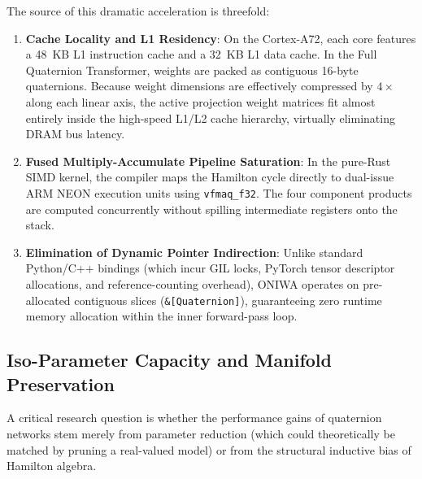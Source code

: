 \documentclass[10pt,twocolumn,letterpaper]{article}
\begin{document}
The source of this dramatic acceleration is threefold:
\begin{enumerate}
    \item \textbf{Cache Locality and L1 Residency}: On the Cortex-A72, each core features a 48~KB L1 instruction cache and a 32~KB L1 data cache. In the Full Quaternion Transformer, weights are packed as contiguous 16-byte quaternions. Because weight dimensions are effectively compressed by $4\times$ along each linear axis, the active projection weight matrices fit almost entirely inside the high-speed L1/L2 cache hierarchy, virtually eliminating DRAM bus latency.
    \item \textbf{Fused Multiply-Accumulate Pipeline Saturation}: In the pure-Rust SIMD kernel, the compiler maps the Hamilton cycle directly to dual-issue ARM NEON execution units using \texttt{vfmaq\_f32}. The four component products are computed concurrently without spilling intermediate registers onto the stack.
    \item \textbf{Elimination of Dynamic Pointer Indirection}: Unlike standard Python/C++ bindings (which incur GIL locks, PyTorch tensor descriptor allocations, and reference-counting overhead), ONIWA operates on pre-allocated contiguous slices (\texttt{\&[Quaternion]}), guaranteeing zero runtime memory allocation within the inner forward-pass loop.
\end{enumerate}

\subsection{Iso-Parameter Capacity and Manifold Preservation}
A critical research question is whether the performance gains of quaternion networks stem merely from parameter reduction (which could theoretically be matched by pruning a real-valued model) or from the structural inductive bias of Hamilton algebra.
\end{document}
